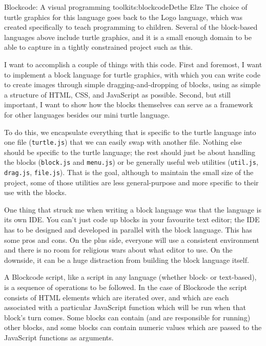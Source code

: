 \begin{aosachapter}{Blockcode: A visual programming toolkit}{s:blockcode}{Dethe Elze}
The choice of turtle graphics for this language goes back to the Logo
language, which was created specifically to teach programming to
children. Several of the block-based languages above include turtle
graphics, and it is a small enough domain to be able to capture in a
tightly constrained project such as this.

\label{goals-and-structure}

I want to accomplish a couple of things with this code. First and
foremost, I want to implement a block language for turtle graphics, with
which you can write code to create images through simple
dragging-and-dropping of blocks, using as simple a structure of HTML,
CSS, and JavaScript as possible. Second, but still important, I want to
show how the blocks themselves can serve as a framework for other
languages besides our mini turtle language.

To do this, we encapsulate everything that is specific to the turtle
language into one file (\texttt{turtle.js}) that we can easily swap with
another file. Nothing else should be specific to the turtle language;
the rest should just be about handling the blocks (\texttt{block.js} and
\texttt{menu.js}) or be generally useful web utilities
(\texttt{util.js}, \texttt{drag.js}, \texttt{file.js}). That is the
goal, although to maintain the small size of the project, some of those
utilities are less general-purpose and more specific to their use with
the blocks.

One thing that struck me when writing a block language was that the
language is its own IDE. You can't just code up blocks in your favourite
text editor; the IDE has to be designed and developed in parallel with
the block language. This has some pros and cons. On the plus side,
everyone will use a consistent environment and there is no room for
religious wars about what editor to use. On the downside, it can be a
huge distraction from building the block language itself.

\label{the-nature-of-scripts}

A Blockcode script, like a script in any language (whether block- or
text-based), is a sequence of operations to be followed. In the case of
Blockcode the script consists of HTML elements which are iterated over,
and which are each associated with a particular JavaScript function
which will be run when that block's turn comes. Some blocks can contain
(and are responsible for running) other blocks, and some blocks can
contain numeric values which are passed to the JavaScript functions as
arguments.


\end{aosachapter}

